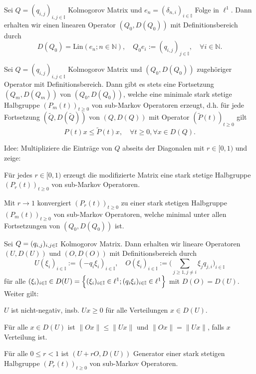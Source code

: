 \documentclass[a4paper]{paper}
\numberwithin{equation}{satz}
\begin{document}
\begin{konstr}
  Sei $Q=(q_{i,j})_{i,j\in\mathbb I}$ Kolmogorov Matrix und $e_n=(\delta_{n,i})_{i\in\mathbb I}$ Folge in $\ell^1$. Dann erhalten wir einen linearen Operator $(Q_0, D(Q_0))$ mit Definitionsbereich durch $$D(Q_0)=\text{Lin}(e_n;n\in\mathbb N),\quad Q_0e_i:=(q_{i,j})_{j\in\mathbb I},\quad \forall i\in\mathbb N.$$
\end{konstr}



\begin{satz}
  Sei $Q=(q_{i,j})_{i,j\in\mathbb I}$ Kolmogorov Matrix und $(Q_0, D(Q_0))$ zugehöriger Operator mit Definitionsbereich. Dann gibt es stets eine Fortsetzung $(Q_m, D(Q_m))$ von $(Q_0, D(Q_0))$, welche eine minimale stark stetige Halbgruppe $(P_m(t))_{t\geq0}$ von sub-Markov Operatoren erzeugt,  d.h. für jede Fortsetzung $(\tilde Q,D(\tilde Q))$ von $(Q, D(Q))$ mit Operator $(\tilde P(t))_{t\geq0}$ gilt $$P(t)x\leq\tilde P(t)x,\quad \forall t\geq 0,\forall x\in D(Q).$$
\end{satz}

\begin{bem}
  Idee: Multipliziere die Einträge von $Q$ abseits der Diagonalen  mit $r\in [0,1)$ und zeige:
  \begin{compactenum}
      \item Für jedes $r\in[0,1)$ erzeugt die modifizierte Matrix eine stark stetige Halbgruppe $(P_r(t))_{t\geq0}$ von sub-Markov Operatoren.
      \item Mit $r\to 1$ konvergiert $(P_r(t))_{t\geq0}$ zu einer stark stetigen Halbgruppe $(P_m(t))_{t\geq0}$ von sub-Markov Operatoren, welche minimal unter allen Fortsetzungen von $(Q_0, D(Q_0))$ ist.
  \end{compactenum}
\end{bem}

\begin{lem}
  Sei $Q=(q_{i,j})_{i,j\in\mathbb{I}}$ Kolmogorov Matrix. Dann erhalten wir lineare Operatoren  $(U,D(U))$ und $(O,D(O))$ mit Definitionsbereich durch  $$U(\xi_i)_{i\in\mathbb I}:=(-q_i\xi_i)_{i\in\mathbb I},\quad O(\xi_i)_{i\in\mathbb I}:=\big(\sum_{j\geq1,j\neq i}\xi_jq_{j,i}\big)_{i\in\mathbb I}$$ für alle  $(\xi_i)_{i\in\mathbb{I}}\in D(U)=\Big\{(\xi_i)_{i\in\mathbb I}\in\ell^1;(q_i\xi_i)_{i\in\mathbb I}\in\ell^1\Big\}$ mit $D(O)=D(U)$. Weiter gilt:
  \begin{compactenum}
    \item $U$ ist nicht-negativ, insb. $Ux\geq0$ für alle Verteilungen $x\in D(U)$.
    \item Für alle $x\in D(U)$ ist $\|Ox\|\leq\|Ux\|$ und $\|Ox\|=\|Ux\|$, falls $x$ Verteilung ist.
    \item Für alle $0\leq r< 1$ ist $(U+rO, D(U))$ Generator einer stark stetigen Halbgruppe $(P_r(t))_{t\geq0}$ von sub-Markov Operatoren.
    \end{compactenum}
\end{lem}
\end{document}
